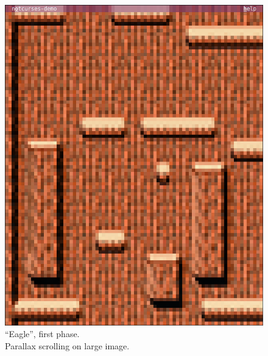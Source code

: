 \documentclass[letterpaper,10pt]{article}
\begin{document}
\begin{figure}
  \centering
  \begin{minipage}{0.45\textwidth}
    \includegraphics[width=1\linewidth]{media/demoeagle2.png}
    \caption{``Eagle'', first phase.\\
      Parallax scrolling on large image.}
  \end{minipage}\hfill
  \begin{minipage}{0.45\textwidth}

\end{minipage}
\end{figure}
\end{document}
